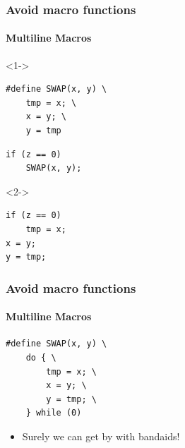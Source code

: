 \documentclass[table]{beamer}
\newcounter{rulecount}
\newcommand{\declarerule}{\textbf{\color{themeblue}{Rule \therulecount:}} }
\begin{document}
\begin{frame}[fragile]
    \frametitle{\declarerule Avoid macro functions}
    \framesubtitle{Multiline Macros}
    
\begin{uncoverenv}<1->
\begin{lstlisting}[title=A multiline macro that swaps the values of two variables]
#define SWAP(x, y) \
    tmp = x; \
    x = y; \
    y = tmp
\end{lstlisting}

\begin{lstlisting}[title=You write]
if (z == 0)
    SWAP(x, y);
\end{lstlisting}
\end{uncoverenv}

\begin{uncoverenv}<2->
\begin{lstlisting}[title=The compiler sees]
if (z == 0)
    tmp = x;
x = y;
y = tmp;
\end{lstlisting}
\end{uncoverenv}
\end{frame}

\begin{frame}[fragile]
    \frametitle{\declarerule Avoid macro functions}
    \framesubtitle{Multiline Macros}
    
    \begin{lstlisting}[title=\textbf{Bandaid solution:} wrap in do-while]
#define SWAP(x, y) \
    do { \
        tmp = x; \
        x = y; \
        y = tmp; \
    } while (0)
\end{lstlisting}
\begin{itemize}
    \item Surely we can get by with bandaids!
\end{itemize}
\end{frame}
\end{document}
